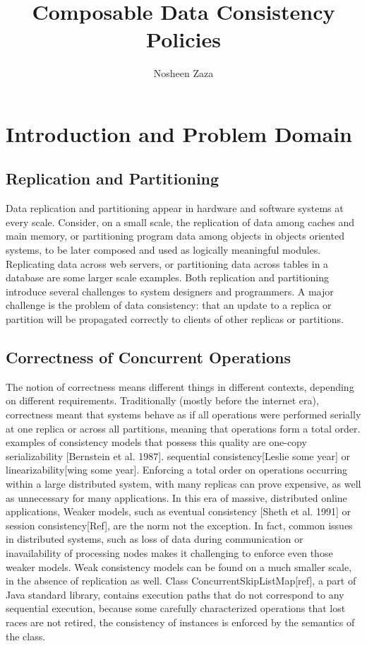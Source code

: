 \documentclass[]{usiinfprospectus}
\author{Nosheen Zaza}
\title{Composable Data Consistency Policies}
\begin{document}
\maketitle


\section{Introduction and Problem Domain}
\subsection {Replication and Partitioning}

Data replication and partitioning appear in hardware and software systems at every scale. Consider, on a small scale, the replication of data among caches and main memory, or partitioning program data among objects in objects oriented systems, to be later composed and used as logically meaningful modules. Replicating data across web servers, or partitioning data across tables in a database are some larger scale examples. 
Both replication and partitioning introduce several challenges to system designers and programmers. A major challenge is the problem of data consistency: that an update to a replica or partition will be propagated correctly to clients of other replicas or partitions. 

\subsection {Correctness of Concurrent Operations}
The notion of correctness means different things in different contexts, depending on different requirements. Traditionally (mostly before the internet era), correctness meant that systems behave as if all operations were performed serially at one replica or across all partitions, meaning that operations form a total order. examples of consistency models that possess this quality are one-copy serializability [Bernstein et al. 1987]. sequential consistency[Leslie some year] or linearizability[wing some year]. Enforcing a total order on operations occurring within a large distributed system, with many replicas can prove expensive, as well as unnecessary for many applications. In this era of massive, distributed online applications, Weaker models, such as eventual consistency [Sheth et al. 1991] or session consistency[Ref], are the norm not the exception. In fact, common issues in distributed systems, such as loss of data during communication or inavailability of processing nodes makes it challenging to enforce even those weaker models.  Weak consistency models can be found on a much smaller scale, in the absence of replication as well. Class ConcurrentSkipListMap[ref], a part of Java standard library, contains execution paths that do not correspond to any sequential execution, because some carefully characterized operations that lost races are not retired, the consistency of instances is enforced by the semantics of the class.
\end{document}
